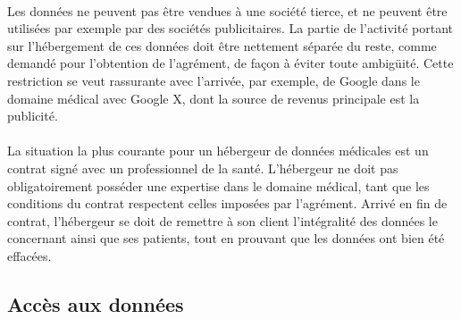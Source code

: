 \paragraph{}
Les données ne peuvent pas être vendues à une société tierce, et ne peuvent
être utilisées par exemple par des sociétés publicitaires. La partie de
l'activité portant sur l'hébergement de ces données doit être nettement séparée
du reste, comme demandé pour l'obtention de l'agrément, de façon à éviter toute
ambigüité. Cette restriction se veut rassurante avec l'arrivée, par exemple, de
Google dans le domaine médical avec Google X, dont la source de revenus
principale est la publicité.

\paragraph{}
La situation la plus courante pour un hébergeur de données médicales est un
contrat signé avec un professionnel de la santé. L'hébergeur ne doit pas
obligatoirement posséder une expertise dans le domaine médical, tant que les
conditions du contrat respectent celles imposées par l'agrément. Arrivé en fin
de contrat, l'hébergeur se doit de remettre à son client l'intégralité des
données le concernant ainsi que ses patients, tout en prouvant que les données
ont bien été effacées.


        \subsection{Accès aux données}
